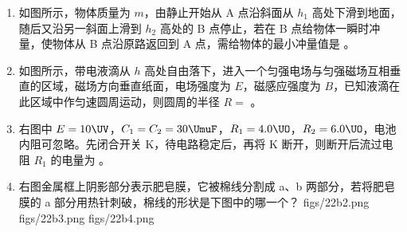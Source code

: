 \documentclass[\gkver]{gaokaozhenti}
\begin{document}
\begin{enumerate}
{\begin{enumerate}
	\item

\end{enumerate}
}

\item
如图所示，物体质量为 $m$，由静止开始从 A 点沿斜面从 $h_{1}$ 高处下滑到地面，随后又沿另一斜面上滑到 $h_{2}$ 高处的 B 点停止，若在 B 点给物体一瞬时冲量，使物体从 B 点沿原路返回到 A 点，需给物体的最小冲量值是 。
\onepicture[align=right, w=7.75cm]{}

\item
如图所示，带电液滴从 $h$ 高处自由落下，进入一个匀强电场与匀强磁场互相垂直的区域，磁场方向垂直纸面，电场强度为 $E$，磁感应强度为 $B$，已知液滴在此区域中作匀速圆周运动，则圆周的半径 $R =$ 。
\onepicture[align=right, h=3.07cm]{}

\item
右图中 $E = 10\UV$，$C_{1} = C_{2} = 30\UmuF$，$R_{1} = 4.0\UO$，$R_{2} = 6.0\UO$，电池内阻可忽略。先闭合开关 K，待电路稳定后，再将 K 断开，则断开后流过电阻 $R_{1}$ 的电量为 。

\item
右图金属框上阴影部分表示肥皂膜，它被棉线分割成 a、b 两部分，若将肥皂膜的 a 部分用热针刺破，棉线的形状是下图中的哪一个？
\onepicture[align=right, h=2.90cm]{}
{figs/22b2.png}
{figs/22b3.png}
{figs/22b4.png}


\end{enumerate}
\end{document}
